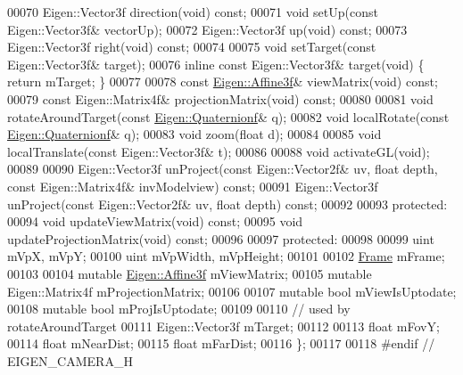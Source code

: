 \begin{DoxyCode}
00070     Eigen::Vector3f direction(\textcolor{keywordtype}{void}) \textcolor{keyword}{const};
00071     \textcolor{keywordtype}{void} setUp(\textcolor{keyword}{const} Eigen::Vector3f& vectorUp);
00072     Eigen::Vector3f up(\textcolor{keywordtype}{void}) \textcolor{keyword}{const};
00073     Eigen::Vector3f right(\textcolor{keywordtype}{void}) \textcolor{keyword}{const};
00074     
00075     \textcolor{keywordtype}{void} setTarget(\textcolor{keyword}{const} Eigen::Vector3f& target);
00076     \textcolor{keyword}{inline} \textcolor{keyword}{const} Eigen::Vector3f& target(\textcolor{keywordtype}{void}) \{ \textcolor{keywordflow}{return} mTarget; \}
00077     
00078     \textcolor{keyword}{const} \hyperlink{group___geometry___module_class_eigen_1_1_transform}{Eigen::Affine3f}& viewMatrix(\textcolor{keywordtype}{void}) \textcolor{keyword}{const};
00079     \textcolor{keyword}{const} Eigen::Matrix4f& projectionMatrix(\textcolor{keywordtype}{void}) \textcolor{keyword}{const};
00080     
00081     \textcolor{keywordtype}{void} rotateAroundTarget(\textcolor{keyword}{const} \hyperlink{group___geometry___module_class_eigen_1_1_quaternion}{Eigen::Quaternionf}& q);
00082     \textcolor{keywordtype}{void} localRotate(\textcolor{keyword}{const} \hyperlink{group___geometry___module_class_eigen_1_1_quaternion}{Eigen::Quaternionf}& q);
00083     \textcolor{keywordtype}{void} zoom(\textcolor{keywordtype}{float} d);
00084     
00085     \textcolor{keywordtype}{void} localTranslate(\textcolor{keyword}{const} Eigen::Vector3f& t);
00086     
00088     \textcolor{keywordtype}{void} activateGL(\textcolor{keywordtype}{void});
00089     
00090     Eigen::Vector3f unProject(\textcolor{keyword}{const} Eigen::Vector2f& uv, \textcolor{keywordtype}{float} depth, \textcolor{keyword}{const} Eigen::Matrix4f& invModelview) \textcolor{keyword}{
      const};
00091     Eigen::Vector3f unProject(\textcolor{keyword}{const} Eigen::Vector2f& uv, \textcolor{keywordtype}{float} depth) \textcolor{keyword}{const};
00092     
00093   \textcolor{keyword}{protected}:
00094     \textcolor{keywordtype}{void} updateViewMatrix(\textcolor{keywordtype}{void}) \textcolor{keyword}{const};
00095     \textcolor{keywordtype}{void} updateProjectionMatrix(\textcolor{keywordtype}{void}) \textcolor{keyword}{const};
00096 
00097   \textcolor{keyword}{protected}:
00098 
00099     uint mVpX, mVpY;
00100     uint mVpWidth, mVpHeight;
00101 
00102     \hyperlink{class_frame}{Frame} mFrame;
00103     
00104     \textcolor{keyword}{mutable} \hyperlink{group___geometry___module_class_eigen_1_1_transform}{Eigen::Affine3f} mViewMatrix;
00105     \textcolor{keyword}{mutable} Eigen::Matrix4f mProjectionMatrix;
00106 
00107     \textcolor{keyword}{mutable} \textcolor{keywordtype}{bool} mViewIsUptodate;
00108     \textcolor{keyword}{mutable} \textcolor{keywordtype}{bool} mProjIsUptodate;
00109 
00110     \textcolor{comment}{// used by rotateAroundTarget}
00111     Eigen::Vector3f mTarget;
00112     
00113     \textcolor{keywordtype}{float} mFovY;
00114     \textcolor{keywordtype}{float} mNearDist;
00115     \textcolor{keywordtype}{float} mFarDist;
00116 \};
00117 
00118 \textcolor{preprocessor}{#endif // EIGEN\_CAMERA\_H}
\end{DoxyCode}
